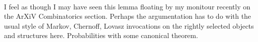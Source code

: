 
 \\
I feel as though I may have seen this lemma floating by my monitour recently on the ArXiV Combinatorics section. Perhaps the argumentation has to do with the usual style of Markov, Chernoff, Lovasz invocations on the rightly selected objects and structures here. Probabilities with some canonical theorem.